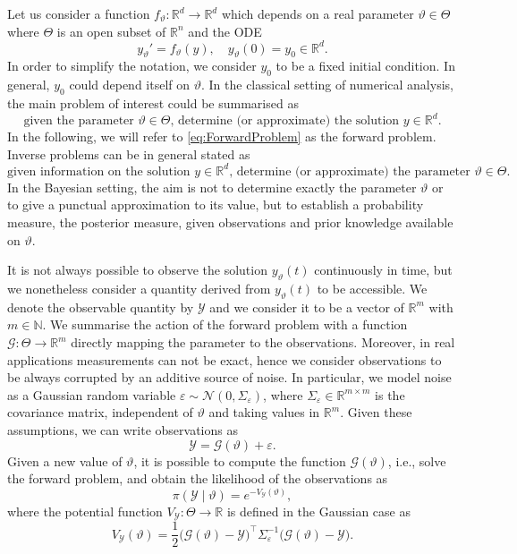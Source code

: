 \documentclass{siamart1116}
\numberwithin{theorem}{section}
\renewcommand{\theta}{\vartheta}
\newcommand{\N}{\mathbb{N}}
\newcommand{\R}{\mathbb{R}}
\newcommand{\epl}{\varepsilon}
\newcommand{\corr}[1]{{\color{bordeaux}#1}}
\begin{document}
Let us consider a function $f_\theta \colon \R^d \to \R^d$ which depends on a real parameter $\theta \in \Theta$ \corr{where $\Theta$ is an open subset of $\R^n$} and the ODE
\begin{equation}\label{eq:ODEParam}
	y_\theta' = f_\theta(y), \quad y_\theta(0) = y_0 \in \R^d.
\end{equation}
In order to simplify the notation, we consider $y_0$ to be a fixed initial condition. In general, $y_0$ could depend itself on $\theta$. In the classical setting of numerical analysis, the main problem of interest could be summarised as  
\begin{equation}\label{eq:ForwardProblem}
	\mbox{given the parameter } \theta \in \Theta \mbox{, determine (or approximate) the solution } y \in \R^d.
\end{equation}
In the following, we will refer to \eqref{eq:ForwardProblem} as the forward problem. \corr{Inverse problems} can be in general stated as
\begin{equation}
	\mbox{given information on the solution } y \in \R^d \mbox{, determine (or approximate) the parameter } \theta \in \Theta.
\end{equation}
In the Bayesian setting, the aim is not \corr{to determine} exactly the parameter $\theta$ or \corr{to give} a punctual approximation to its value, but \corr{to establish} a probability measure, the posterior measure, given observations and prior knowledge available on $\theta$. 

It is not always possible to observe the solution $y_\theta(t)$ continuously in time, but we nonetheless consider a quantity derived from $y_\theta(t)$ to be accessible. We denote the observable quantity \corr{by} $\mathcal{Y}$ and we consider it to be a vector of $\R^m$ \corr{with $m \in \N$}. We summarise the action of the forward problem with a function $\mathcal{G} \colon \Theta \to \R^m$ directly mapping the parameter to the observations. Moreover, in real applications measurements can not be exact, hence we consider observations to be always corrupted by an additive source of noise. In particular, we model noise as a Gaussian random variable $\epl \sim \mathcal{N}(0, \Sigma_\epl)$, \corr{where $\Sigma_\epl \in \R^{m \times m}$ is the covariance matrix}, independent of $\theta$ and taking values in $\R^m$. Given these assumptions, we can write observations as 
\begin{equation}
	\mathcal{Y} = \mathcal{G}(\theta) + \epl.
\end{equation}
Given a new value of $\theta$, it is possible to compute the function $\mathcal{G}(\theta)$, i.e., solve the forward problem, and obtain the likelihood of the observations as 
\begin{equation}
	\pi(\mathcal{Y} \mid \theta) = e^{-V_\mathcal{Y}(\theta)},
\end{equation}
where the potential function $V_\mathcal{Y}\colon\Theta \to \R$ is defined in the Gaussian case as
\begin{equation}
	V_\mathcal{Y}(\theta) = \frac{1}{2}\big(\mathcal{G}(\theta) - \mathcal{Y}\big)^\top \Sigma_\epl^{-1} \big(\mathcal{G}(\theta) - \mathcal{Y}\big).
\end{equation}
\end{document}
